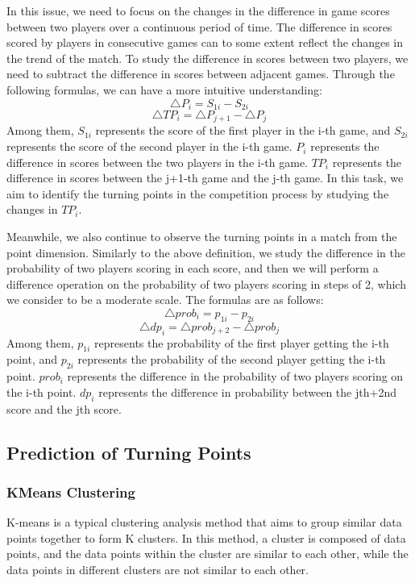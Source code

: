 \documentclass{mcmthesis}
\begin{document}
In this issue, we need to focus on the changes in the difference in game scores between two players over a continuous period of time. The difference in scores scored by players in consecutive games can to some extent reflect the changes in the trend of the match. To study the difference in scores between two players, we need to subtract the difference in scores between adjacent games. Through the following formulas, we can have a more intuitive understanding:
\[
	\bigtriangleup P_i = S_{1i} - S_{2i}
\]
\[
	\bigtriangleup TP_i = \bigtriangleup P_{j + 1} - \bigtriangleup P_j
\]
Among them, $S_{1i}$ represents the score of the first player in the i-th game, and $S_{2i}$ represents the score of the second player in the i-th game. $P_i$ represents the difference in scores between the two players in the i-th game. $TP_i$ represents the difference in scores between the j+1-th game and the j-th game. In this task, we aim to identify the turning points in the competition process by studying the changes in $TP_i$.

Meanwhile, we also continue to observe the turning points in a match from the point dimension. Similarly to the above definition, we study the difference in the probability of two players scoring in each score, and then we will perform a difference operation on the probability of two players scoring in steps of 2, which we consider to be a moderate scale. The formulas are as follows:
\[
	\bigtriangleup prob_i = p_{1i} - p_{2i}
\]
\[
	\bigtriangleup dp_i = \bigtriangleup prob_{j + 2} - \bigtriangleup prob_j
\]
Among them, $p_{1i}$ represents the probability of the first player getting the i-th point, and $p_{2i}$ represents the probability of the second player getting the i-th point. $prob_i$ represents the difference in the probability of two players scoring on the i-th point. $dp_i$ represents the difference in probability between the jth+2nd score and the jth score.

\subsection{Prediction of Turning Points}
\subsubsection{KMeans Clustering}
K-means is a typical clustering analysis method that aims to group similar data points together to form K clusters. In this method, a cluster is composed of data points, and the data points within the cluster are similar to each other, while the data points in different clusters are not similar to each other.
\end{document}
